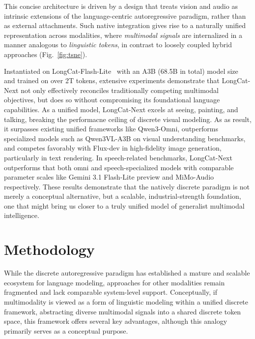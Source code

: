 \documentclass{article}
\begin{document}
This concise architecture is driven by a design that treats vision and audio as intrinsic extensions of the language-centric autoregressive paradigm, rather than as external attachments. Such native integration gives rise to a naturally unified representation across modalities, where \textit{multimodal signals} are internalized in a manner analogous to \textit{linguistic tokens}, in contrast to loosely coupled hybrid approaches (Fig.~\ref{fig:tsne}).


Instantiated on LongCat-Flash-Lite~\cite{longcat-flash-lite} with an A3B (68.5B in total) model size and trained on over 2T tokens, extensive experiments demonstrate that LongCat-Next not only effectively reconciles traditionally competing multimodal objectives, but does so without compromising its foundational language capabilities. 
As a unified model, LongCat-Next excels at seeing, painting, and talking, breaking the performacne ceiling of discrete visual modeling. As as result, it surpasses existing unified frameworks like Qwen3-Omni, outperforms specialized models such as Qwen3VL-A3B on visual understanding benchmarks, and competes favorably with Flux-dev in high-fidelity image generation, particularly in text rendering.
In speech-related benchmarks, LongCat-Next outperforms that both omni and speech-specialized models with comparable parameter scales like Gemini 3.1 Flash-Lite preview and MiMo-Audio respectively. These results demonstrate that the natively discrete paradigm is not merely a conceptual alternative, but a scalable, industrial-strength foundation, one that might bring us closer to a truly unified model of generalist multimodal intelligence.




\section{Methodology}




While the discrete autoregressive paradigm has established a mature and scalable ecosystem for language modeling, approaches for other modalities remain fragmented and lack comparable system-level support. Conceptually, if multimodality is viewed as a form of linguistic modeling within a unified discrete framework, abstracting diverse multimodal signals into a shared discrete token space, this framework offers several key advantages, although this analogy primarily serves as a conceptual purpose.
\end{document}
